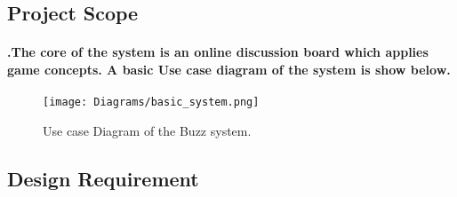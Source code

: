 \documentclass[12pt]{article}
\begin{document}
\subsection{Project Scope}
\paragraph{.The core of the system is an online discussion board which applies game concepts. A basic Use case diagram of the system is show below.}

\begin{figure}[h!]
\texttt{[image: Diagrams/basic\_system.png]}
\caption{Use case Diagram of the Buzz system.}
\end{figure}


\newpage
\subsection{Design Requirement}
\paragraph{}
\end{document}

